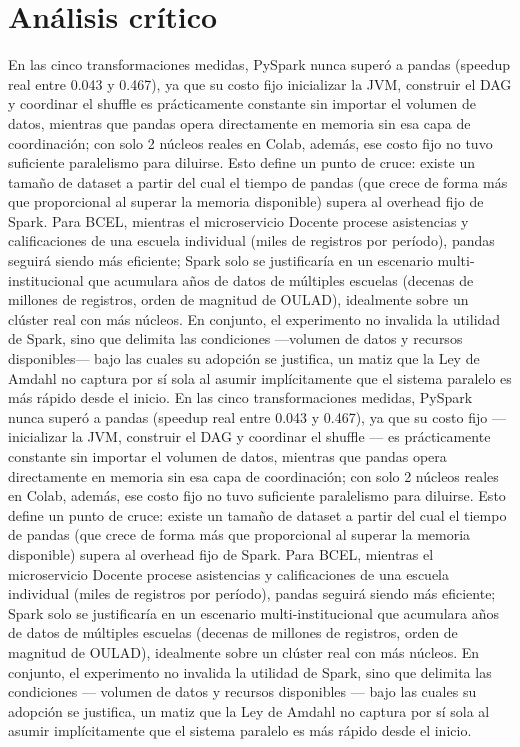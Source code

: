 \documentclass[11pt,a4paper]{article}
\begin{document}
\section{Análisis crítico}
En las cinco transformaciones medidas, PySpark nunca superó a pandas (speedup real entre 0.043 y 0.467), ya que su costo fijo inicializar la JVM, construir el DAG y coordinar el shuffle es prácticamente constante sin importar el volumen de datos, mientras que pandas opera directamente en memoria sin esa capa de coordinación; con solo 2 núcleos reales en Colab, además, ese costo fijo no tuvo suficiente paralelismo para diluirse. Esto define un punto de cruce: existe un tamaño de dataset a partir del cual el tiempo de pandas (que crece de forma más que proporcional al superar la memoria disponible) supera al overhead fijo de Spark. Para BCEL, mientras el microservicio Docente procese asistencias y calificaciones de una escuela individual (miles de registros por período), pandas seguirá siendo más eficiente; Spark solo se justificaría en un escenario multi-institucional que acumulara años de datos de múltiples escuelas (decenas de millones de registros, orden de magnitud de OULAD), idealmente sobre un clúster real con más núcleos. En conjunto, el experimento no invalida la utilidad de Spark, sino que delimita las condiciones —volumen de datos y recursos disponibles— bajo las cuales su adopción se justifica, un matiz que la Ley de Amdahl no captura por sí sola al asumir implícitamente que el sistema paralelo es más rápido desde el inicio.
En las cinco transformaciones medidas, PySpark nunca superó a pandas
(speedup real entre 0.043 y 0.467), ya que su costo fijo --- inicializar
la JVM, construir el DAG y coordinar el shuffle --- es prácticamente
constante sin importar el volumen de datos, mientras que pandas opera
directamente en memoria sin esa capa de coordinación; con solo 2 núcleos
reales en Colab, además, ese costo fijo no tuvo suficiente paralelismo
para diluirse. Esto define un punto de cruce: existe un tamaño de dataset
a partir del cual el tiempo de pandas (que crece de forma más que
proporcional al superar la memoria disponible) supera al overhead fijo de
Spark. Para BCEL, mientras el microservicio Docente procese asistencias y
calificaciones de una escuela individual (miles de registros por
período), pandas seguirá siendo más eficiente; Spark solo se justificaría
en un escenario multi-institucional que acumulara años de datos de
múltiples escuelas (decenas de millones de registros, orden de magnitud
de OULAD), idealmente sobre un clúster real con más núcleos. En conjunto,
el experimento no invalida la utilidad de Spark, sino que delimita las
condiciones --- volumen de datos y recursos disponibles --- bajo las
cuales su adopción se justifica, un matiz que la Ley de Amdahl no captura
por sí sola al asumir implícitamente que el sistema paralelo es más
rápido desde el inicio.
\end{document}
